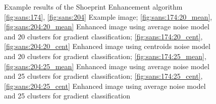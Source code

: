 \documentclass[draft,final]{vutinfth} %
\begin{document}
{\begin{figure}[H]

\caption{Example results of the Shoeprint Enhancement algorithm
				\ref{fig:sans:174}, \ref{fig:sans:204} Example image; \ref{fig:sans:174:20_mean}, \ref{fig:sans:204:20_mean} Enhanced image using average noise model and 20 clusters for gradient classification; \ref{fig:sans:174:20_cent}, \ref{fig:sans:204:20_cent} Enhanced image using centroids noise model and 20 clusters for gradient classification; \ref{fig:sans:174:25_mean}, \ref{fig:sans:204:25_mean} Enhanced image using average noise model and 25 clusters for gradient classification; \ref{fig:sans:174:25_cent}, \ref{fig:sans:204:25_cent} Enhanced image using average noise model and 25 clusters for gradient classification}
\label{fig:sans:res2}

\end{figure}
}
\end{document}
